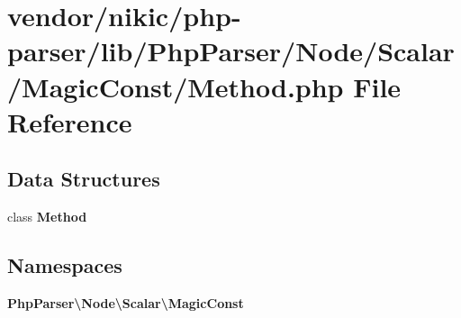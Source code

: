 \section{vendor/nikic/php-\/parser/lib/\+Php\+Parser/\+Node/\+Scalar/\+Magic\+Const/\+Method.php File Reference}
\label{nikic_2php-parser_2lib_2_php_parser_2_node_2_scalar_2_magic_const_2_method_8php}
\subsection*{Data Structures}
\begin{DoxyCompactItemize}
\item 
class {\bf Method}
\end{DoxyCompactItemize}
\subsection*{Namespaces}
\begin{DoxyCompactItemize}
\item 
 {\bf Php\+Parser\textbackslash{}\+Node\textbackslash{}\+Scalar\textbackslash{}\+Magic\+Const}
\end{DoxyCompactItemize}
